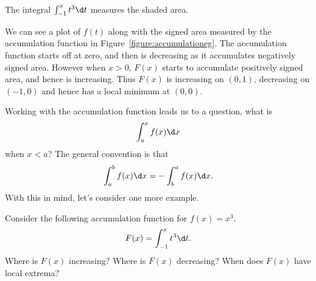 \begin{marginfigure}[-3in]
\caption{The integral $\int_{-1}^x t^3 \d t$ measures the shaded area.}
\label{figure:accumulationeg}
\end{marginfigure}

\begin{solution}
We can see a plot of $f(t)$ along with the signed area measured by the
accumulation function in Figure~\ref{figure:accumulationeg}. The
accumulation function starts off at zero, and then is decreasing as it
accumulates negatively signed area. However when $x>0$, $F(x)$ starts
to accumulate positively signed area, and hence is increasing. Thus
$F(x)$ is increasing on $(0,1)$, decreasing on $(-1,0)$ and hence has
a local minimum at $(0,0)$.
\end{solution}

Working with the accumulation function leads us to a question, what is  
\[
\int_a^x f(x) \d x
\]
when $x< a$? The general convention is that 
\[
\int_a^b f(x) \d x = -\int_b^a f(x) \d x. 
\]
With this in mind, let's consider one more example.


\begin{example} 
Consider the following accumulation function for $f(x) = x^3$.
\[
F(x) = \int_{-1}^x t^3 \d t.
\]
Where is $F(x)$ increasing? Where is $F(x)$ decreasing? When does
$F(x)$ have local extrema?
\end{example}

